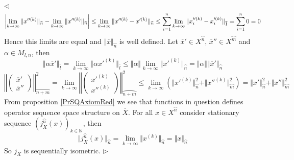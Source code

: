 \documentclass[12pt]{article}
\newenvironment{proof}{\par $\triangleleft$}{$\triangleright$}
\begin{document}
\begin{proof}
$$
\left|\lim\limits_{k\to\infty}\Vert x''^{(k)}\Vert_{\wideparen{n}}-\lim\limits_{k\to\infty}\Vert x''^{(k)}\Vert_{\wideparen{n}}\right|\leq
\lim\limits_{k\to\infty}\Vert x''^{(k)}-x'^{(k)}\Vert_{\wideparen{n}}\leq
\sum\limits_{i=1}^n\lim\limits_{k\to\infty}\Vert x_i''^{(k)}-x_i'^{(k)}\Vert_{\wideparen{1}}\\
=\sum\limits_{i=1}^n0=0
$$
Hence this limits are equal and $\Vert \overline{x}\Vert_{\wideparen{n}}$ is well defined. Let $\overline{x}'\in X^{\wideparen{n}}$, $\overline{x}''\in X^{\wideparen{m}}$ and $\alpha\in M_{l,n}$, then
$$
\Vert\alpha\overline{x}'\Vert_{\wideparen{l}}
=\lim\limits_{k\to\infty}\Vert\alpha x'^{(k)}\Vert_{\wideparen{l}}
\leq\Vert\alpha\Vert\lim\limits_{k\to\infty}\Vert x'^{(k)}\Vert_{\wideparen{n}}
=\Vert\alpha\Vert\Vert\overline{x}'\Vert_{\wideparen{n}}
$$
$$
\left\Vert\begin{pmatrix} \overline{x}'\\ \overline{x}''\end{pmatrix}\right\Vert_{\wideparen{n+m}}^2
=\lim\limits_{k\to\infty}\left\Vert\begin{pmatrix} x'^{(k)}\\ x''^{(k)}\end{pmatrix}\right\Vert_{\wideparen{n+m}}^2
\leq\lim\limits_{k\to\infty}(\Vert x'^{(k)}\Vert_{\wideparen{n}}^2+\Vert x''^{(k)}\Vert_{\wideparen{m}}^2)
=\Vert\overline{x}'\Vert_{\wideparen{n}}^2+\Vert\overline{x}''\Vert_{\wideparen{m}}^2
$$
From proposition \ref{PrSQAxiomRed} we see that functions in question defines operator sequence space structure on $\overline{X}$. For all $x\in X^{\wideparen{n}}$ consider stationary   sequence $(j_X^{\wideparen{n}}(x))_{k\in\mathbb{N}}$, then
$$
\Vert j_X^{\wideparen{n}}(x)\Vert_{\wideparen{n}}
=\lim\limits_{k\to\infty}\Vert x^{(k)}\Vert_{\wideparen{n}}
=\Vert x\Vert_{\wideparen{n}}
$$
So $j_X$ is sequentially isometric.
\end{proof}
\end{document}
